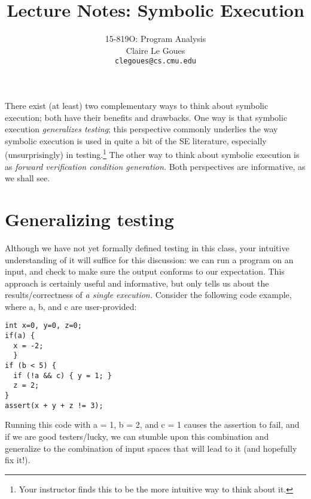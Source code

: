 \documentclass[11pt]{article}
\title{Lecture Notes: Symbolic Execution}
\author{15-819O: Program Analysis \\
        Claire Le Goues \\
		{\tt clegoues@cs.cmu.edu}}
\date{}
\begin{document}
\newtheorem{theorem}{Theorem}
\newtheorem{lemma}[theorem]{Lemma}

\maketitle


\newcommand{\pfalse}{\mbox{false}}
\newcommand{\ptrue}{\mbox{true}}
\newcommand{\pand}{\mbox{and}}
\newcommand{\por}{\mbox{or}}
\newcommand{\pskip}{\mbox{skip}}
\newcommand{\pif}{\mbox{if}}
\newcommand{\pthen}{\mbox{then}}
\newcommand{\pelse}{\mbox{else}}
\newcommand{\pdo}{\mbox{do}}
\newcommand{\pwhile}{\mbox{while}}

\newcommand{\mtrue}{\mathbf{true}}
\newcommand{\mfalse}{\mathbf{false}}


There exist (at least) two complementary ways to think about symbolic execution; both have their benefits and drawbacks.  One way is that symbolic execution \emph{generalizes testing}; this perspective commonly underlies the way symbolic execution is used in quite a bit of the SE literature, especially (unsurprisingly) in testing.\footnote{Your instructor finds this to be the more intuitive way to think about it.} The other way to think about symbolic execution is as \emph{forward verification condition generation.} Both perspectives are informative, as we shall see. 

\section{Generalizing testing}

Although we have not yet formally defined testing in this class, your intuitive understanding of it will suffice for this discussion: we can run a program on an input, and check to make sure the output conforms to our expectation.   This approach is certainly useful and informative, but only tells us about the results/correctness of \emph{a single execution.}  Consider the following code example, where a, b, and c are user-provided:

\begin{lstlisting}
int x=0, y=0, z=0;
if(a) {
  x = -2;
  }
if (b < 5) {
  if (!a && c) { y = 1; }
  z = 2;
}
assert(x + y + z != 3);
\end{lstlisting}

\noindent Running this code with a = 1, b = 2, and c = 1 causes the assertion to fail, and if we are good testers/lucky, we can stumble upon this combination and generalize to the combination of input spaces that will lead to it (and hopefully fix it!).
\end{document}
